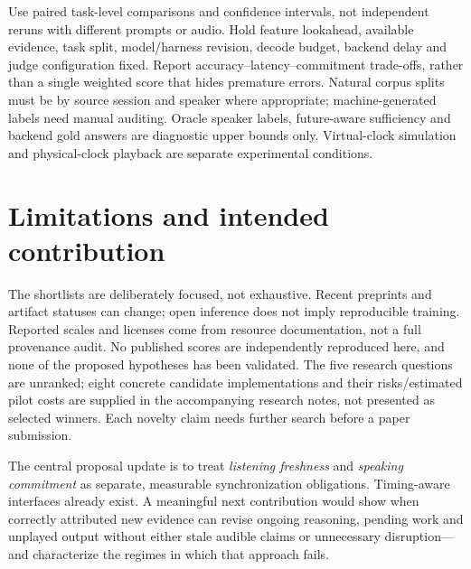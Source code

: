 \documentclass{article}
\begin{document}
Use paired task-level comparisons and confidence intervals, not independent reruns with different prompts or audio. Hold feature lookahead, available evidence, task split, model/harness revision, decode budget, backend delay and judge configuration fixed. Report accuracy--latency--commitment trade-offs, rather than a single weighted score that hides premature errors. Natural corpus splits must be by source session and speaker where appropriate; machine-generated labels need manual auditing. Oracle speaker labels, future-aware sufficiency and backend gold answers are diagnostic upper bounds only. Virtual-clock simulation and physical-clock playback are separate experimental conditions.

\section{Limitations and intended contribution}
\label{sec:limits}
The shortlists are deliberately focused, not exhaustive. Recent preprints and artifact statuses can change; open inference does not imply reproducible training. Reported scales and licenses come from resource documentation, not a full provenance audit. No published scores are independently reproduced here, and none of the proposed hypotheses has been validated. The five research questions are unranked; eight concrete candidate implementations and their risks/estimated pilot costs are supplied in the accompanying research notes, not presented as selected winners. Each novelty claim needs further search before a paper submission.

The central proposal update is to treat \emph{listening freshness} and \emph{speaking commitment} as separate, measurable synchronization obligations. Timing-aware interfaces already exist. A meaningful next contribution would show when correctly attributed new evidence can revise ongoing reasoning, pending work and unplayed output without either stale audible claims or unnecessary disruption---and characterize the regimes in which that approach fails.

\begingroup
\footnotesize
\setlength{\bibsep}{1pt}


\endgroup
\end{document}
